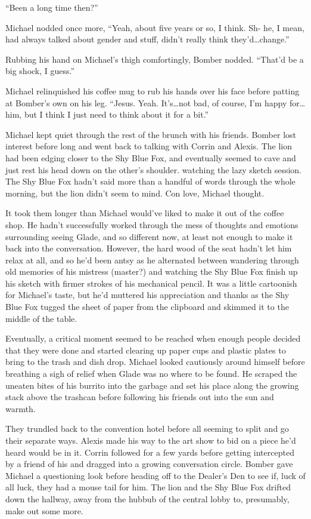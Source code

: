 ``Been a long time then?''

Michael nodded once more, ``Yeah, about five years or so, I think.  Sh- he, I mean, had always talked about gender and stuff, didn't really think they'd\ldots{}change.''

Rubbing his hand on Michael's thigh comfortingly, Bomber nodded.  ``That'd be a big shock, I guess.''

Michael relinquished his coffee mug to rub his hands over his face before patting at Bomber's own on his leg.  ``Jesus.  Yeah.  It's\ldots{}not bad, of course, I'm happy for\ldots{}him, but I think I just need to think about it for a bit.''

Michael kept quiet through the rest of the brunch with his friends.  Bomber lost interest before long and went back to talking with Corrin and Alexis.  The lion had been edging closer to the Shy Blue Fox, and eventually seemed to cave and just rest his head down on the other's shoulder. watching the lazy sketch session.  The Shy Blue Fox hadn't said more than a handful of words through the whole morning, but the lion didn't seem to mind.  Con love, Michael thought.

It took them longer than Michael would've liked to make it out of the coffee shop.  He hadn't successfully worked through the mess of thoughts and emotions surrounding seeing Glade, and so different now, at least not enough to make it back into the conversation.  However, the hard wood of the seat hadn't let him relax at all, and so he'd been antsy as he alternated between wandering through old memories of his mistress (master?) and watching the Shy Blue Fox finish up his sketch with firmer strokes of his mechanical pencil.  It was a little cartoonish for Michael's taste, but he'd muttered his appreciation and thanks as the Shy Blue Fox tugged the sheet of paper from the clipboard and skimmed it to the middle of the table.

Eventually, a critical moment seemed to be reached when enough people decided that they were done and started clearing up paper cups and plastic plates to bring to the trash and dish drop.  Michael looked cautiously around himself before breathing a sigh of relief when Glade was no where to be found.  He scraped the uneaten bites of his burrito into the garbage and set his place along the growing stack above the trashcan before following his friends out into the sun and warmth.

They trundled back to the convention hotel before all seeming to split and go their separate ways. Alexis made his way to the art show to bid on a piece he'd heard would be in it.  Corrin followed for a few yards before getting intercepted by a friend of his and dragged into a growing conversation circle.  Bomber gave Michael a questioning look before heading off to the Dealer's Den to see if, luck of all luck, they had a mouse tail for him.  The lion and the Shy Blue Fox drifted down the hallway, away from the hubbub of the central lobby to, presumably, make out some more.

